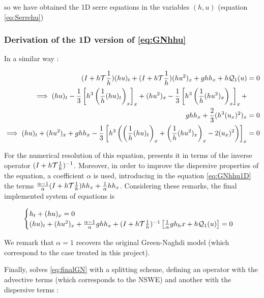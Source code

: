 \noindent so we have obtained the 1D serre equations in the variables $(h,u)$ (equation \eqref{eq:Serrehu})

\subsubsection{Derivation of the 1D version of \eqref{eq:GNhhu}}

\indent In a similar way :

\begin{equation}
	\label{eq:GNhhu1D}
	\begin{split}	
		(I + h\mathcal{T}\frac{1}{h}) (hu)_t + (I + h\mathcal{T}\frac{1}{h})(hu^2)_x + ghh_x + h\mathcal{Q}_1(u) &= 0 \\
		\implies (hu)_t - \frac{1}{3} \left[h^3 \left(\frac{1}{h} (hu)_t \right)_x \right]_x + (hu^2)_x - \frac{1}{3} \left[h^3 \left(\frac{1}{h} (hu^2)_x  \right)_x \right]_x + \\ ghh_x + \frac{2}{3}(h^3(u_x)^2)_x &= 0 \\
		\implies (hu)_t + (hu^2)_x + ghh_x - \frac{1}{3} \left[  h^3 \left( \left(\frac{1}{h} (hu)_t \right)_x + \left(\frac{1}{h} (hu^2)_x  \right)_x - 2(u_x)^2 \right) \right]_x &= 0
	\end{split}
\end{equation}

\indent For the numerical resolution of this equation, \cite{Bonneton2011} presents it in terms of the inverse operator $(I + h\mathcal{T}\frac{1}{h})^{-1}$. Moreover, in order to improve the dispersive properties of the equation, a coefficient $\alpha$ is used, introducing in the equation \eqref{eq:GNhhu1D} the terms $\frac{\alpha-1}{\alpha}(I + h\mathcal{T}\frac{1}{h})hh_x + \frac{1}{\alpha}hh_x$. Considering these remarks, the final implemented system of equations is

\begin{equation}
	\label{eq:finalGN}
	\begin{cases}
		h_t + (hu)_x = 0 \\
		(hu)_t + (hu^2)_x + \frac{\alpha-1}{\alpha}ghh_x + (I + h\mathcal{T}\frac{1}{h})^{-1}\left[ \frac{1}{\alpha}gh_hx + h\mathcal{Q}_1(u) \right] = 0
	\end{cases}
\end{equation}

\indent We remark that $\alpha=1$ recovers the original Green-Naghdi model (which correspond to the case treated in this project).

\indent Finally, \cite{Bonneton2011} solves \ref{eq:finalGN} with a splitting scheme, defining an operator with the advective terms (which corresponds to the NSWE) and another with the dispersive terms :

